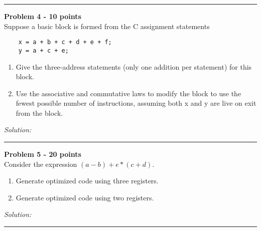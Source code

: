 \documentclass[a4paper, 11pt]{article}
\newenvironment{problem}[2][Problem]
    { \begin{mdframed}[backgroundcolor=gray!20] \textbf{#1 #2} \\}
    {  \end{mdframed}}
\newenvironment{solution}
    {\textit{Solution:}}
    {}
\begin{document}
\noindent\rule{7in}{2.8pt}

\begin{problem}{4 - 10 points}
Suppose a basic block is formed from the C assignment statements
\begin{verbatim}
    x = a + b + c + d + e + f;  
    y = a + c + e;
\end{verbatim}

\begin{enumerate}[a]
    \item Give the three-address statements (only one addition per statement) for  this block.
    \item Use the associative and commutative laws to modify the block to use the  fewest possible number of instructions, assuming both x and y are live on  exit from the block.
\end{enumerate}

\end{problem}

\begin{solution}
\end{solution}


\noindent\rule{7in}{2.8pt}

\begin{problem}{5 - 20 points}
Consider the expression $(a-b) + e * (c+d)$.
\begin{enumerate}[a]
    \item Generate optimized code using three registers.
    \item Generate optimized code using two registers.
\end{enumerate}

\end{problem}

\begin{solution}
\end{solution}

\noindent\rule{7in}{2.8pt}
\end{document}
